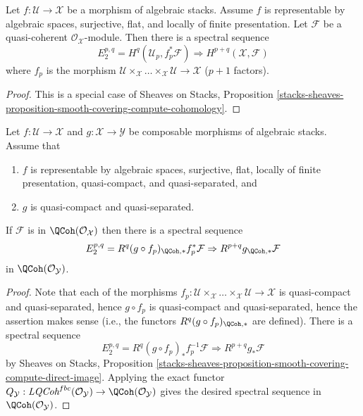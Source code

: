 \begin{proposition}
\label{proposition-smooth-covering-compute-cohomology}
Let $f : \mathcal{U} \to \mathcal{X}$ be a morphism of algebraic stacks.
Assume $f$ is representable by algebraic spaces, surjective, flat, and
locally of finite presentation. Let $\mathcal{F}$ be a quasi-coherent
$\mathcal{O}_\mathcal{X}$-module. Then there is a spectral sequence
$$
E_2^{p, q} = H^q(\mathcal{U}_p, f_p^*\mathcal{F})
\Rightarrow
H^{p + q}(\mathcal{X}, \mathcal{F})
$$
where $f_p$ is the morphism
$\mathcal{U} \times_\mathcal{X} \ldots \times_\mathcal{X} \mathcal{U} \to
\mathcal{X}$ ($p + 1$ factors).
\end{proposition}

\begin{proof}
This is a special case of
Sheaves on Stacks, Proposition
\ref{stacks-sheaves-proposition-smooth-covering-compute-cohomology}.
\end{proof}

\begin{proposition}
\label{proposition-smooth-covering-compute-direct-image}
Let $f : \mathcal{U} \to \mathcal{X}$ and $g : \mathcal{X} \to \mathcal{Y}$
be composable morphisms of algebraic stacks.
Assume that
\begin{enumerate}
\item $f$ is representable by algebraic spaces, surjective,
flat, locally of finite presentation, quasi-compact, and quasi-separated, and
\item $g$ is quasi-compact and quasi-separated.
\end{enumerate}
If $\mathcal{F}$ is in $\QCoh(\mathcal{O}_\mathcal{X})$ then
there is a spectral sequence
$$
E_2^{p, q} = R^q(g \circ f_p)_{\QCoh, *}f_p^*\mathcal{F}
\Rightarrow
R^{p + q}g_{\QCoh, *}\mathcal{F}
$$
in $\QCoh(\mathcal{O}_\mathcal{Y})$.
\end{proposition}

\begin{proof}
Note that each of the morphisms
$f_p : \mathcal{U} \times_\mathcal{X} \ldots \times_\mathcal{X} \mathcal{U} \to
\mathcal{X}$ is quasi-compact and quasi-separated, hence $g \circ f_p$
is quasi-compact and quasi-separated, hence the assertion makes sense
(i.e., the functors $R^q(g \circ f_p)_{\QCoh, *}$ are defined).
There is a spectral sequence
$$
E_2^{p, q} = R^q(g \circ f_p)_*f_p^{-1}\mathcal{F}
\Rightarrow
R^{p + q}g_*\mathcal{F}
$$
by Sheaves on Stacks, Proposition
\ref{stacks-sheaves-proposition-smooth-covering-compute-direct-image}.
Applying the exact functor
$Q_\mathcal{Y} : \textit{LQCoh}^{fbc}(\mathcal{O}_\mathcal{Y}) \to
\QCoh(\mathcal{O}_\mathcal{Y})$ gives the desired spectral sequence in
$\QCoh(\mathcal{O}_\mathcal{Y})$.
\end{proof}








